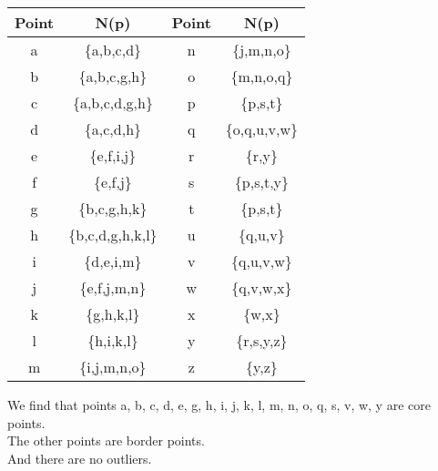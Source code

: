 \begin{table}[h]
    \centering
    \begin{tabular}{@{}|c|c|c|c|@{}}
        \hline
        Point & N(p) & Point & N(p)   \\
        \hline
        a & \{a,b,c,d\} & n & \{j,m,n,o\} \\
        \hline
        b & \{a,b,c,g,h\} & o & \{m,n,o,q\} \\
        \hline
        c & \{a,b,c,d,g,h\} & p & \{p,s,t\} \\
        \hline
        d & \{a,c,d,h\} & q & \{o,q,u,v,w\} \\
        \hline
        e & \{e,f,i,j\} & r & \{r,y\} \\
        \hline
        f & \{e,f,j\} & s & \{p,s,t,y\} \\
        \hline
        g & \{b,c,g,h,k\} & t & \{p,s,t\} \\
        \hline
        h & \{b,c,d,g,h,k,l\} & u & \{q,u,v\} \\
        \hline
        i & \{d,e,i,m\} & v & \{q,u,v,w\} \\
        \hline
        j & \{e,f,j,m,n\} & w & \{q,v,w,x\} \\
        \hline
        k & \{g,h,k,l\} & x & \{w,x\} \\
        \hline
        l & \{h,i,k,l\} & y & \{r,s,y,z\} \\
        \hline
        m & \{i,j,m,n,o\} & z & \{y,z\} \\
        \hline
    \end{tabular}
\end{table}

We find that points a, b, c, d, e, g, h, i, j, k, l, m, n, o, q, s, v, w, y are core points. \\
The other points are border points. \\
And there are no outliers.


